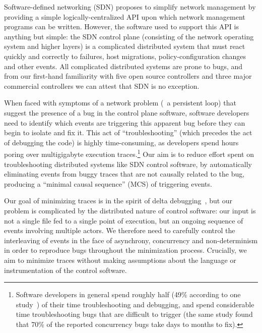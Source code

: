 Software-defined networking (SDN) proposes to simplify network management by
providing a simple logically-centralized API upon which network management
programs can be written. However, the software used to support this API is
anything but simple: the SDN control plane (consisting of the network
operating system and higher layers) is a complicated distributed system that
must react quickly and correctly to failures, host migrations,
policy-configuration changes and other events.
All complicated distributed systems are prone to bugs, and from our first-hand
familiarity with five open source controllers and three major commercial
controllers we can attest that SDN is no exception.

When faced with symptoms of a network problem (\eg~a persistent loop)
that suggest the presence of a bug in the control plane software,
software developers need to identify which events are triggering
this apparent bug before they can begin to isolate and fix it.
This act of ``troubleshooting'' (which precedes the act of debugging the
code) is highly time-consuming, as developers spend hours poring
over multigigabyte execution traces.\footnote{Software developers in general spend roughly half (49\% according to one
study~\cite{msoft_concurrency}) of their time troubleshooting and debugging, and spend
considerable time troubleshooting bugs that are difficult to trigger (the same study found
that 70\% of the reported concurrency bugs take days to months to fix).}
Our aim is to reduce effort spent on troubleshooting distributed systems like
SDN control software, by automatically eliminating
events from buggy traces that are not causally related to the bug, producing a ``minimal
causal sequence'' (MCS) of triggering events.

Our goal of minimizing traces is in the spirit of
delta debugging~\cite{Zeller:1999:YMP:318773.318946}, but our problem is
complicated by the distributed nature of control software:
our input is not a single file fed to a single point of execution, but an ongoing
sequence of events involving
multiple actors. We therefore need to carefully
control the interleaving of events in the face of asynchrony, concurrency and non-determinism in
order to reproduce bugs throughout the minimization process.
Crucially, we aim to
minimize traces without making assumptions about the language
or instrumentation of the control software.

